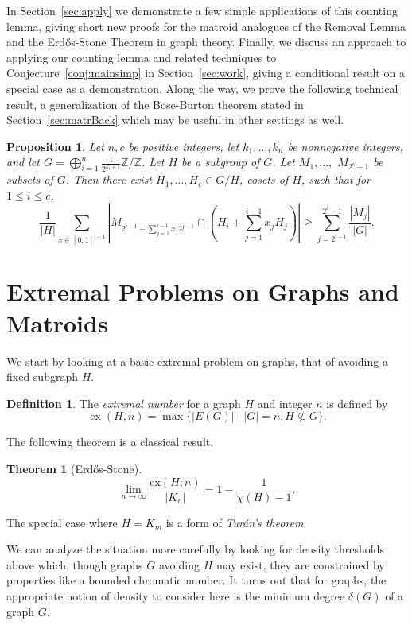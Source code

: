 \documentclass{article}
\theoremstyle{plain}
\newtheorem{thm}[theorem]{Theorem}
\newtheorem{prop}[theorem]{Proposition}
\theoremstyle{definition}
\theoremstyle{definition}
\newtheorem{defn}[theorem]{Definition}
\theoremstyle{remark}
\numberwithin{equation}{section}
\newcommand{\ZZ}{\mathbb{Z}}
\DeclareMathOperator{\ex}{ex}
\begin{document}
In Section~\ref{sec:apply} we demonstrate a few simple applications of this counting lemma, giving short new proofs for the matroid analogues of the Removal Lemma and the Erd\H{o}s-Stone Theorem in graph theory. Finally, we discuss an approach to applying our counting lemma and related techniques to Conjecture~\ref{conj:mainsimp} in Section~\ref{sec:work}, giving a conditional result on a special case as a demonstration. Along the way, we prove the following technical result, a generalization of the Bose-Burton theorem stated in Section~\ref{sec:matrBack} which may be useful in other settings as well.

\begin{prop}
\label{prop:extBB}
Let $n,c$ be positive integers, let $k_1,\dots,k_n$ be nonnegative integers, and let $G = \bigoplus_{i=1}^n \frac{1}{2^{k_i+1}}\ZZ/\ZZ$. Let $H$ be a subgroup of $G$. Let $M_1,\dots,$ $M_{2^c-1}$ be subsets of $G$. Then there exist $H_1,\dots,H_c\in G/H$, cosets of $H$, such that for $1\leq i\leq c$,
\begin{equation}
    \frac{1}{|H|}\sum_{x\in[0,1]^{i-1}} \left | M_{2^{i-1}+\sum_{j=1}^{i-1} x_j 2^{j-1}}\cap \left( H_i + \sum_{j=1}^{i-1} x_j H_j \right ) \right | \geq \sum_{j=2^{i-1}}^{2^i-1}\frac{|M_j|}{|G|}.\tag{$*$}
\end{equation}
\end{prop}

\section{Extremal Problems on Graphs and Matroids}

We start by looking at a basic extremal problem on graphs, that of avoiding a fixed subgraph $H$.

\begin{defn}
The \emph{extremal number} for a graph $H$ and integer $n$ is defined by
$$\ex(H,n)=\max\{|E(G)| \mid |G|=n, H\not\subseteq G\}.$$
\end{defn}

The following theorem is a classical result.

\begin{thm}[Erd\H{o}s-Stone]
\label{thm:ES}
\[\lim_{n\rightarrow \infty} \frac{\text{ex}(H;n)}{|K_n|}=1-\frac{1}{\chi(H)-1}.\]
\end{thm}

The special case where $H=K_m$ is a form of \emph{Turán's theorem}.

We can analyze the situation more carefully by looking for density thresholds above which, though graphs $G$ avoiding $H$ may exist, they are constrained by properties like a bounded chromatic number. It turns out that for graphs, the appropriate notion of density to consider here is the minimum degree $\delta(G)$ of a graph $G$.
\end{document}
